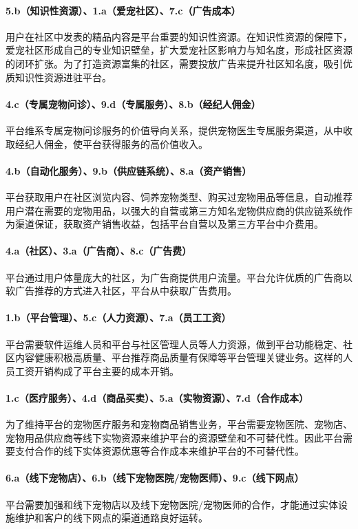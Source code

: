 \documentclass[a4paper]{ctexart}
\begin{document}
\paragraph{5.b（知识性资源）、1.a（爱宠社区）、7.c（广告成本）}用户在社区中发表的精品内容是平台重要的知识性资源。在知识性资源的保障下，爱宠社区形成自己的专业知识壁垒，扩大爱宠社区影响力与知名度，形成社区资源的闭环扩张。为了打造资源富集的社区，需要投放广告来提升社区知名度，吸引优质知识性资源进驻平台。
\paragraph{4.c（专属宠物问诊）、9.d（专属服务）、8.b（经纪人佣金）}平台维系专属宠物问诊服务的价值导向关系，提供宠物医生专属服务渠道，从中收取经纪人佣金，使平台获得服务的高价值收入。
\paragraph{4.b（自动化服务）、9.b（供应链系统）、8.a（资产销售）}平台获取用户在社区浏览内容、饲养宠物类型、购买过宠物用品等信息，自动推荐用户潜在需要的宠物用品，以强大的自营或第三方知名宠物供应商的供应链系统作为渠道保证，获取资产销售收益，包括平台自营以及第三方平台中介费用。
\paragraph{4.a（社区）、3.a（广告商）、8.c（广告费）}平台通过用户体量庞大的社区，为广告商提供用户流量。平台允许优质的广告商以软广告推荐的方式进入社区，平台从中获取广告费用。
\paragraph{1.b（平台管理）、5.c（人力资源）、7.a（员工工资）}平台需要软件运维人员和平台与社区管理人员等人力资源，做到平台功能稳定、社区内容健康积极高质量、平台推荐商品质量有保障等平台管理关键业务。这样的人员工资开销构成了平台主要的成本开销。
\paragraph{1.c（医疗服务）、4.d（商品买卖）、5.a（实物资源）、7.d（合作成本）}为了维持平台的宠物医疗服务和宠物商品销售业务，平台需要宠物医院、宠物店、宠物用品供应商等线下实物资源来维护平台的资源壁垒和不可替代性。因此平台需要支付合作的线下实体资源优惠等合作成本来维护平台的不可替代性。
\paragraph{6.a（线下宠物店）、6.b（线下宠物医院/宠物医师）、9.c（线下网点）}平台需要加强和线下宠物店以及线下宠物医院/宠物医师的合作，才能通过实体设施维护和客户的线下网点的渠道通路良好运转。
\end{document}
